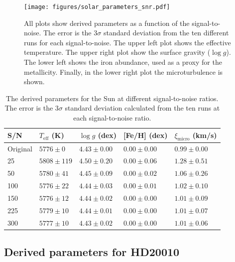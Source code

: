 \documentclass{aa}
\begin{document}
\begin{figure}[tbp!]
    \centering
    \texttt{[image: figures/solar\_parameters\_snr.pdf]}
    \caption{All plots show derived parameters as a function of the
    signal-to-noise. The error is the 3$\sigma$ standard deviation from
    the ten different runs for each signal-to-noise. The upper left plot
    shows the effective temperature. The upper right plot show the
    surface gravity ($\log g$). The lower left shows the iron abundance,
    used as a proxy for the metallicity. Finally, in the lower right
    plot the microturbulence is shown.}
    \label{fig:snr_sun}
\end{figure}

\begin{table}[htb!]
    \caption{The derived parameters for the Sun at different
    signal-to-noise ratios. The error is the 3$\sigma$ standard
    deviation calculated from the ten runs at each signal-to-noise
    ratio.}
    \label{tab:solar_params}
    \centering
    \begin{tabular}{lllll}
      \hline\hline
        S/N & $T_\mathrm{eff}$ (K) & $\log g$ (dex)  &  [Fe/H] (dex)    & $\xi_\mathrm{micro}$ (km/s)  \\
      \hline
  Original  &  $5776 \pm 0$        & $4.43 \pm 0.00$ & $0.00 \pm 0.00$  & $0.99 \pm 0.00$              \\
      \hline
        25  &  $5808 \pm 119$      & $4.50 \pm 0.20$ & $0.00 \pm 0.06$  & $1.28 \pm 0.51$              \\
        50  &  $5780 \pm 41$       & $4.45 \pm 0.09$ & $0.00 \pm 0.02$  & $1.06 \pm 0.26$              \\
       100  &  $5776 \pm 22$       & $4.44 \pm 0.03$ & $0.00 \pm 0.01$  & $1.02 \pm 0.10$              \\
       150  &  $5776 \pm 12$       & $4.44 \pm 0.02$ & $0.00 \pm 0.00$  & $1.01 \pm 0.09$              \\
       225  &  $5779 \pm 10$       & $4.44 \pm 0.01$ & $0.00 \pm 0.00$  & $1.01 \pm 0.07$              \\
       300  &  $5777 \pm 10$       & $4.43 \pm 0.02$ & $0.00 \pm 0.00$  & $1.01 \pm 0.06$              \\
      \hline
    \end{tabular}
\end{table}



\subsection{Derived parameters for HD20010}
\label{sec:derived_parameters_of_hd20010}
\end{document}
